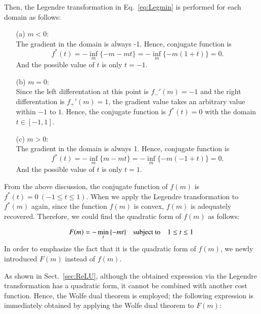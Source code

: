 \documentclass[fp,twocolumn]{jpsj3}
\begin{document}
Then, the Legendre transformation in Eq.~\eqref{eq:Legmin} is performed for each domain as follows:

\begin{itemize}
\item[(a)]$m<0:$ \\
  The gradient in the domain is always -1. Hence, conjugate function is
  \begin{equation}
    f^{*}(t)=-\inf_{m}\{-m - mt\}=-\inf_{m}\{-m(1+t)\}=0. \nonumber
  \end{equation}
  And the possible value of $t$ is only $t=-1$.
\item[(b)]$m=0:$ \\
  Since the left differentation at this point is $f_{-}'(m)=-1$ and the right differentation is $f_{+}'(m)=1$, the gradient value takes an arbitrary value within $-1$ to $1$. Hence, the conjugate function is $f^{*}(t)=0$ with the domain $t \in [-1,1]$.
\item[(c)]$m>0:$ \\
  The gradient in the domain is always 1. Hence, conjugate function is
  \begin{equation}
    f^{*}(t)=-\inf_{m}\{m - mt\}=-\inf_{m}\{-m(-1+t)\}=0. \nonumber
  \end{equation}
  And the possible value of $t$ is only $t=1$.
\end{itemize}

From the above discussion, the conjugate function of $f(m)$ is $f^{*}(t)=0\ (-1\leq t\leq 1)$. When we apply the Legendre transformation to $f^{*}(m)$ again, since the function $f(m)$ is convex, $f(m)$ is adequately recovered. Therefore, we could find the quadratic form of $f(m)$ as follows:

\begin{eqnarray}
  F(m)=-\min_{t}{\{-mt\}} \quad \text{subject to} \quad \-1 \leq t \leq 1 \label{legendre}
\end{eqnarray}
In order to emphasize the fact that it is the quadratic form of $f(m)$, we newly introduced $F(m)$ instead of $f(m)$.


As shown in Sect.~\ref{sec:ReLU}, although the obtained expression via the Legendre transformation has a quadratic form, it cannot be combined with another cost function.
Hence, the Wolfe dual theorem is employed;
the following expression is immediately obtained by applying the Wolfe dual theorem to $F(m)$:
\end{document}
